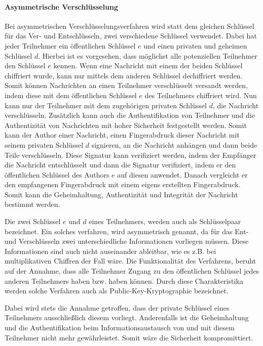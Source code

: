             \paragraph{Asymmetrische Verschlüsselung}
            \label{Asymmetrische Verschlüsselnung}
                Bei asymmetrischen Verschlüsselungsverfahren wird statt dem gleichen Schlüssel für das Ver- und Entschlüsseln, zwei verschiedene Schlüssel verwendet. Dabei hat jeder Teilnehmer ein öffentlichen Schlüssel $e$ und einen privaten und geheimen Schlüssel $d$. Hierbei ist es vorgesehen, dass möglichst alle potenziellen Teilnehmer den Schlüssel $e$ kennen. Wenn eine Nachricht mit einem der beiden Schlüssel chiffriert wurde, kann nur mittels dem anderen Schlüssel dechiffriert werden. Somit können Nachrichten an einen Teilnehmer verschlüsselt versandt werden, indem diese mit dem öffentlichen Schlüssel $e$ des Teilnehmers chiffriert wird. Nun kann nur der Teilnehmer mit dem zugehörigen privaten Schlüssel $d$, die Nachricht verschlüsseln. Zusätzlich kann auch die Authentifikation von Teilnehmer und die Authentizität von Nachrichten mit hoher Sicherheit festgestellt werden. Somit kann der Author einer Nachricht, einen Fingerabdruck dieser Nachricht mit seinem privaten Schlüssel $d$ signieren, an die Nachricht anhängen und dann beide Teile verschlüsseln. Diese Signatur kann verifiziert werden, indem der Empfänger die Nachricht entschlüsselt und dann die Signatur verifiziert, indem er den öffentlichen Schlüssel des Authors $e$ auf diesen anwendet. Danach vergleicht er den empfangenen Fingerabdruck mit einem eigens erstellten Fingerabdruck. Somit kann die Geheimhaltung, Authentizität und Integrität der Nachricht bestimmt werden.
                
                Die zwei Schlüssel $e$ und $d$ eines Teilnehmers, werden auch als Schlüsselpaar bezeichnet. Ein solches verfahren, wird asymmetrisch genannt, da für das Ent- und Verschlüsseln zwei unterschiedliche Informationen vorliegen müssen. Diese Informationen sind auch nicht auseinander ableitbar, wie es z.B. bei multiplikativen Chiffren der Fall wäre. Die Funktionalität des Verfahrens, beruht auf der Annahme, dass alle Teilnehmer Zugang zu den öffentlichen Schlüssel jedes anderen Teilnehmers haben bzw. haben können. Durch diese Charakteristika werden solche Verfahren auch als Public-Key-Kryptographie bezeichnet.

                Dabei wird stets die Annahme getroffen, dass der private Schlüssel eines Teilnehmers ausschließlich diesem vorliegt. Anderenfalls ist die Geheimhaltung und die Authentifikation beim Informationsaustausch von und mit diesem Teilnehmer nicht mehr gewährleistet. Somit wäre die Sicherheit kompromittiert.
                
